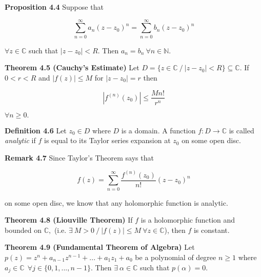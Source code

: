 \documentclass{article}
\begin{document}
\bigskip

\textbf{Proposition 4.4} Suppose that 

\begin{equation}
    \sum_{n = 0}^{\infty} a_n(z - z_0)^n = \sum_{n = 0}^{\infty} b_n(z - z_0)^n
\end{equation}

$\forall z \in \mathbb{C}$ such that $|z-z_0|<R.$ Then $a_n = b_n \ \forall n \in \mathbb{N}.$

\bigskip

\textbf{Theorem 4.5 (Cauchy's Estimate)} Let $D = \{ z \in \mathbb{C} \ / \ |z-z_0|<R \} \subseteq \mathbb{C}.$ If $0<r<R$ and $|f(z)| \leq M$ for $|z-z_0| = r$ then 

\begin{equation}
    |f^{(n)}(z_0)| \leq \frac{Mn!}{r^n}
\end{equation}

$\forall n \geq 0.$

\bigskip

\textbf{Definition 4.6} Let $z_0 \in D$ where $D$ is a domain. A function $f:D \rightarrow \mathbb{C}$ is called {\it{analytic}} if $f$ is equal to its Taylor series expansion at $z_0$ on some open disc.

\bigskip

\textbf{Remark 4.7} Since Taylor's Theorem says that 

\begin{equation}
    f(z) = \sum_{n = 0}^{\infty} \frac{f^{(n)}(z_0)}{n!}(z-z_0)^n
\end{equation}

on some open disc, we know that any holomorphic function is analytic. 

\bigskip

\textbf{Theorem 4.8 (Liouville Theorem)} If $f$ is a holomorphic function and bounded on $\mathbb{C},$ (i.e. $\exists \ M>0 \ / \ |f(z)| \leq M \ \forall z \in \mathbb{C}$), then $f$ is constant. 

\bigskip

\textbf{Theorem 4.9 (Fundamental Theorem of Algebra)} Let $p(z) = z^n + a_{n-1}z^{n-1} + ... + a_1z_1 + a_0$ be a polynomial of degree $n \geq 1$ where $a_j \in \mathbb{C} \ \ \forall j \in \{0, 1, ..., n-1 \}.$ Then $\exists \ \alpha \in \mathbb{C}$ such that $p(\alpha) = 0.$
\end{document}
